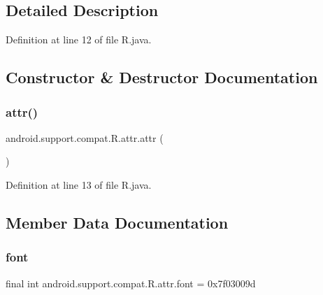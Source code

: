 \subsection{Detailed Description}


Definition at line 12 of file R.\+java.



\subsection{Constructor \& Destructor Documentation}
\mbox{\label{classandroid_1_1support_1_1compat_1_1_r_1_1attr_ab6d46d4f02cbae6e5d468914d3b096a5}} 
\subsubsection{\texorpdfstring{attr()}{attr()}}
{\footnotesize\ttfamily android.\+support.\+compat.\+R.\+attr.\+attr (\begin{DoxyParamCaption}{ }\end{DoxyParamCaption})\hspace{0.3cm}{\ttfamily [private]}}



Definition at line 13 of file R.\+java.


\begin{DoxyCode}{0}

\end{DoxyCode}


\subsection{Member Data Documentation}
\mbox{\label{classandroid_1_1support_1_1compat_1_1_r_1_1attr_a81787f6b5888bbbadbced1dcdf540898}} 
\subsubsection{\texorpdfstring{font}{font}}
{\footnotesize\ttfamily final int android.\+support.\+compat.\+R.\+attr.\+font = 0x7f03009d\hspace{0.3cm}{\ttfamily [static]}}



